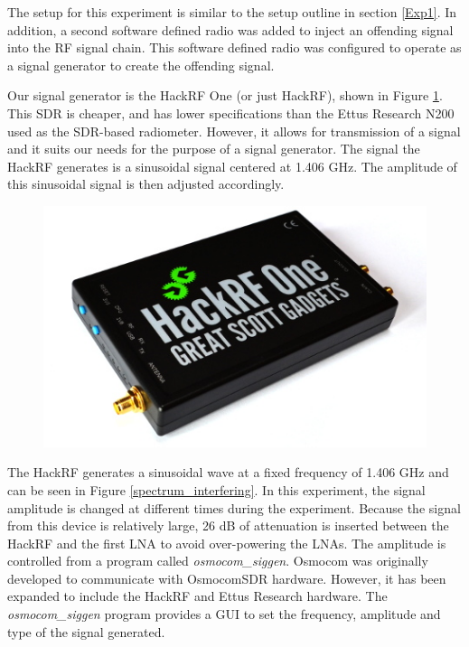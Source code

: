 The setup for this experiment is similar to the setup outline in section \ref{Exp1}.  In addition, a second software defined radio was added to inject an offending signal into the RF signal chain.  This software defined radio was configured to operate as a signal generator to create the offending signal.  

Our signal generator is the HackRF One (or just HackRF), shown in Figure \ref{HackRF}.  This SDR is cheaper, and has lower specifications than the Ettus Research N200 used as the SDR-based radiometer.  However, it allows for transmission of a signal and it suits our needs for the purpose of a signal generator.  The signal the HackRF generates is a sinusoidal signal centered at 1.406 GHz.  The amplitude of this sinusoidal signal is then adjusted accordingly.  

\begin{figure}[h!tb] \centering

\includegraphics[width=12cm]{Images/hackrf.jpg}
\label{HackRF}
\end{figure} 

The HackRF generates a sinusoidal wave at a fixed frequency of 1.406 GHz and can be seen in Figure \ref{spectrum_interfering}.  In this experiment, the signal amplitude is changed at different times during the experiment.  Because the signal from this device is relatively large, 26 dB of attenuation is inserted between the HackRF and the first LNA to avoid over-powering the LNAs.  The amplitude is controlled from a program called \emph{osmocom\_siggen}.  Osmocom was originally developed to communicate with OsmocomSDR hardware.  However, it has been expanded to include the HackRF and Ettus Research hardware.  The \emph{osmocom\_siggen} program provides a GUI to set the frequency, amplitude and type of the signal generated.  


